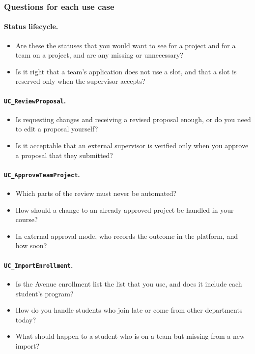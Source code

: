 \documentclass[12pt, titlepage]{article}
\begin{document}
  \subsubsection{Questions for each use case}

  \paragraph{Status lifecycle.}
  \begin{itemize}
    \item Are these the statuses that you would want to see for a project and for a team on a project, and are any missing or unnecessary?
    \item Is it right that a team's application does not use a slot, and that a slot is reserved only when the supervisor accepts?
  \end{itemize}

  \paragraph{\texttt{UC\_ReviewProposal}.}
  \begin{itemize}
    \item Is requesting changes and receiving a revised proposal enough, or do you need to edit a proposal yourself?
    \item Is it acceptable that an external supervisor is verified only when you approve a proposal that they submitted?
  \end{itemize}

  \paragraph{\texttt{UC\_ApproveTeamProject}.}
  \begin{itemize}
    \item Which parts of the review must never be automated?
    \item How should a change to an already approved project be handled in your course?
    \item In external approval mode, who records the outcome in the platform, and how soon?
  \end{itemize}

  \paragraph{\texttt{UC\_ImportEnrollment}.}
  \begin{itemize}
    \item Is the Avenue enrollment list the list that you use, and does it include each student's program?
    \item How do you handle students who join late or come from other departments today?
    \item What should happen to a student who is on a team but missing from a new import?
  \end{itemize}
\end{document}
